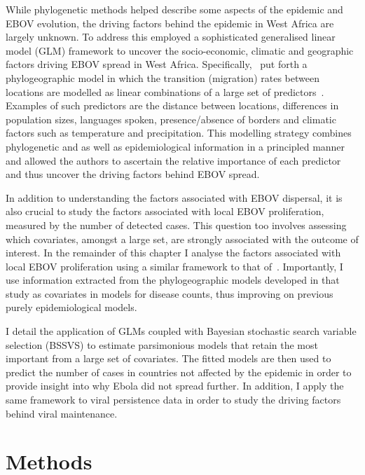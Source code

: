 While phylogenetic methods helped describe some aspects of the epidemic and EBOV evolution, the driving factors behind the epidemic in West Africa are largely unknown.
To address this \cite{Dudas2017} employed a sophisticated generalised linear model (GLM) framework to uncover the socio-economic, climatic and geographic factors driving EBOV spread in West Africa.
Specifically,~\cite{Dudas2017} put forth a phylogeographic model in which the transition (migration) rates between locations are modelled as linear combinations of a large set of predictors~\cite{Lemey2014}.
Examples of such predictors are the distance between locations, differences in population sizes, languages spoken, presence/absence of borders and climatic factors such as temperature and precipitation.
This modelling strategy combines phylogenetic and as well as epidemiological information in a principled manner and allowed the authors to ascertain the relative importance of each predictor and thus uncover the driving factors behind EBOV spread.

In addition to understanding the factors associated with EBOV dispersal, it is also crucial to study the factors associated with local EBOV proliferation, measured by the number of detected cases.
This question too involves assessing which covariates, amongst a large set, are strongly associated with the outcome of interest.
In the remainder of this chapter I analyse the factors associated with local EBOV proliferation using a similar framework to that of~\cite{Dudas2017}.
Importantly, I use information extracted from the phylogeographic models developed in that study as covariates in models for disease counts, thus improving on previous purely epidemiological models.

I detail the application of GLMs coupled with Bayesian stochastic search variable selection (BSSVS) to estimate parsimonious models that retain the most important from a large set of covariates.
The fitted models are then used to predict the number of cases in countries not affected by the epidemic in order to provide insight into why Ebola did not spread further.
In addition, I apply the same framework to viral persistence data in order to study the driving factors behind viral maintenance.

\section{Methods}

